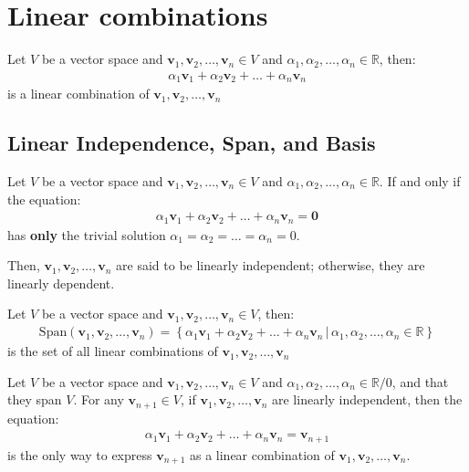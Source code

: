 \documentclass[11pt]{article}
\begin{document}
\section{Linear combinations}
\begin{definition}
    Let $V$ be a vector space and $\textbf{v}_1, \textbf{v}_2, \ldots, \textbf{v}_n \in V$ and $\alpha_1, \alpha_2, \ldots, \alpha_n \in \mathbb{R}$, then:
    \begin{align*}
        \alpha_1 \textbf{v}_1 + \alpha_2 \textbf{v}_2 + \ldots + \alpha_n \textbf{v}_n
    \end{align*}
    is a linear combination of $\textbf{v}_1, \textbf{v}_2, \ldots, \textbf{v}_n$
\end{definition}
\subsection{Linear Independence, Span, and Basis}
\begin{definition}
    Let $V$ be a vector space and $\textbf{v}_1, \textbf{v}_2, \ldots, \textbf{v}_n \in V$ and $\alpha_1, \alpha_2, \ldots, \alpha_n \in \mathbb{R}$. If and only if the equation:
    \begin{align*}
        \alpha_1 \textbf{v}_1 + \alpha_2 \textbf{v}_2 + \ldots + \alpha_n \textbf{v}_n = \textbf{0}
    \end{align*}
    has \textbf{only} the trivial solution $\alpha_1 = \alpha_2 = \ldots = \alpha_n = 0$.

    Then, $\textbf{v}_1, \textbf{v}_2, \ldots, \textbf{v}_n$ are said to be linearly independent; otherwise, they are linearly dependent.
\end{definition}
\begin{definition}[Span]
    Let $V$ be a vector space and $\textbf{v}_1, \textbf{v}_2, \ldots, \textbf{v}_n \in V$, then:
    \begin{align}
        \text{Span}(\textbf{v}_1, \textbf{v}_2, \ldots, \textbf{v}_n) = \left\{ \alpha_1 \textbf{v}_1 + \alpha_2 \textbf{v}_2 + \ldots + \alpha_n \textbf{v}_n \, | \, \alpha_1, \alpha_2, \ldots, \alpha_n \in \mathbb{R} \right\}
    \end{align}
    is the set of all linear combinations of $\textbf{v}_1, \textbf{v}_2, \ldots, \textbf{v}_n$
\end{definition}
\begin{theorem}
    Let $V$ be a vector space and $\textbf{v}_1, \textbf{v}_2, \ldots, \textbf{v}_n \in V$ and $\alpha_1, \alpha_2, \ldots, \alpha_n \in \mathbb{R}/0$, and that they span $V$. For any $\textbf{v}_{n+1} \in V$, if $\textbf{v}_1, \textbf{v}_2, \ldots, \textbf{v}_n$ are linearly independent, then the equation:
    \begin{align*}
        \alpha_1 \textbf{v}_1 + \alpha_2 \textbf{v}_2 + \ldots + \alpha_n \textbf{v}_n = \textbf{v}_{n+1}  
    \end{align*} 
    is the only way to express $\textbf{v}_{n+1}$ as a linear combination of $\textbf{v}_1, \textbf{v}_2, \ldots, \textbf{v}_n$.
\end{theorem}
\end{document}
